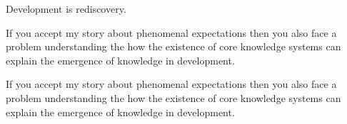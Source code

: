 \documentclass[12pt,\papersize]{extarticle}
\begin{document}
Development is rediscovery.



If you accept my story about phenomenal expectations then
you also face a problem understanding the how the existence of core knowledge
systems can explain the emergence of knowledge in development.


If you accept my story about phenomenal expectations then
you also face a problem understanding the how the existence of core knowledge
systems can explain the emergence of knowledge in development.












\end{document}
